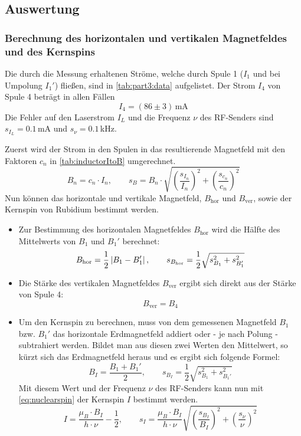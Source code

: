 \subsection{Auswertung}
\label{sect:doppelresauswertung}
\subsubsection*{Berechnung des horizontalen und vertikalen Magnetfeldes und des Kernspins}
Die durch die Messung erhaltenen Ströme, welche durch Spule 1 ($I_1$ und bei Umpolung $I_1'$) fließen, sind in \autoref{tab:part3:data} 
aufgelistet. Der Strom $I_4$ von Spule 4 beträgt in allen Fällen
\begin{equation}
    I_4 = (86 \pm 3)\,\text{mA}
\end{equation}
Die Fehler auf den Laserstrom $I_L$ und die Frequenz $\nu$ des RF-Senders sind $s_{I_L} = 0.1$\,mA und $s_\nu=0.1$\,kHz. 

Zuerst wird der Strom in den Spulen in das resultierende Magnetfeld mit den Faktoren $c_n$ in \autoref{tab:inductorItoB} umgerechnet.
\begin{equation}
    B_n = c_n \cdot I_n, \qquad s_{B} = B_n \cdot \sqrt{ \left( \frac{s_{I_n}}{I_n} \right)^2 + \left( \frac{s_{c_n}}{c_n} \right)^2 }
\end{equation}
Nun können das horizontale und vertikale Magnetfeld, $B_\text{hor}$ und $B_\text{ver}$, sowie der Kernspin von Rubidium bestimmt werden.
\begin{itemize}
    \item Zur Bestimmung des horizontalen Magnetfeldes $B_\text{hor}$ wird die Hälfte des Mittelwerts von $B_1$ und $B_1'$ berechnet:
    \begin{equation}
        B_\text{hor} = \frac{1}{2} \left|B_1 - B_1'\right|, \qquad s_{B_\text{hor}} = \frac{1}{2} \sqrt{s_{B_1}^2 + s_{B_1'}^2}
    \end{equation}
    \item Die Stärke des vertikalen Magnetfeldes $B_\text{ver}$ ergibt sich direkt aus der Stärke von Spule 4:
    \begin{equation}
        B_\text{ver} = B_4
    \end{equation}
    \item Um den Kernspin zu berechnen, muss von dem gemessenen Magnetfeld $B_1$ bzw. $B_1'$ das horizontale Erdmagnetfeld addiert oder - je nach
    Polung - subtrahiert werden. Bildet man aus diesen zwei Werten den Mittelwert, so kürzt sich das Erdmagnetfeld heraus und es ergibt sich
    folgende Formel:
    \begin{equation}
        B_I = \frac{B_1 + B_1'}{2}, \qquad s_{B_I} = \frac{1}{2} \sqrt{s_{B_1}^2 + s_{B_1'}^2}
    \end{equation}
    Mit diesem Wert und der Frequenz $\nu$ des RF-Senders kann nun mit \autoref{eq:nuclearspin} der Kernspin $I$ bestimmt werden. 
    \begin{equation}
        I = \frac{\mu_B \cdot B_I}{h \cdot \nu} - \frac{1}{2}, \qquad s_I = \frac{\mu_B \cdot B_I}{h \cdot \nu} \sqrt{ \left( \frac{s_{B_I}}{B_I} \right)^2 + \left( \frac{s_\nu}{\nu} \right)^2}
    \end{equation}
\end{itemize}

